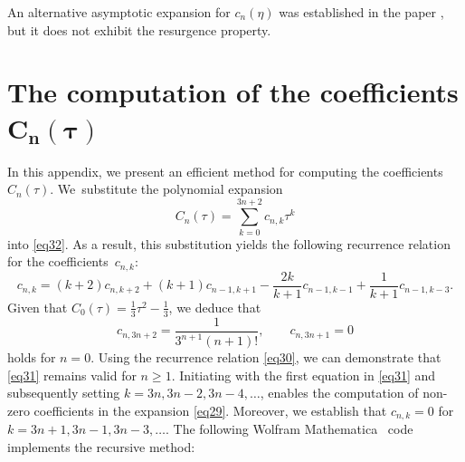 \documentclass[11pt]{article}
\numberwithin{equation}{section}
\numberwithin{equation}{section}
\begin{document}
An alternative asymptotic expansion for $c_n (\eta)$ was established in the paper \cite{Dunster1998}, but it does not exhibit the resurgence property.

\section[The computation of the coefficients C\_n(tau)]{The computation of the coefficients $\boldsymbol{C_n(\tau)}$}\label{appendixb}

In this appendix, we present an efficient method for computing the coefficients $C_n(\tau)$. We~substitute the polynomial expansion
\begin{equation}\label{eq29}
C_n(\tau) = \sum_{k=0}^{3n+2} c_{n,k}\tau^k
\end{equation}
into \eqref{eq32}. As a result, this substitution yields the following recurrence relation for the coefficients~$c_{n,k}$:
\begin{equation}\label{eq30}
c_{n,k}=(k+2)c_{n,k+2}+(k+1) c_{n-1,k+1}-\frac{2k}{k+1}c_{n-1,k-1}+\frac{1}{k+1}c_{n-1,k-3}.
\end{equation}
Given that $C_0 (\tau ) = \frac{1}{3}\tau^2 -\frac{1}{3}$, we deduce that
\begin{equation}\label{eq31}
c_{n,3n+2}=\frac{1}{3^{n+1}(n+1)!},\qquad c_{n,3n+1}=0
\end{equation}
holds for $n=0$. Using the recurrence relation \eqref{eq30}, we can demonstrate that \eqref{eq31} remains valid for $n\geq1$. Initiating with the first equation in \eqref{eq31} and subsequently setting $k=3n, 3n-2, \allowbreak 3n-4, \dots$, enables the computation of non-zero coefficients in the expansion \eqref{eq29}. Moreover, we establish that $c_{n,k}=0$ for $k=3n+1, 3n-1, 3n-3, \dots$. The following Wolfram Mathematica~\cite{Mathematica} code implements the recursive method:
\end{document}
